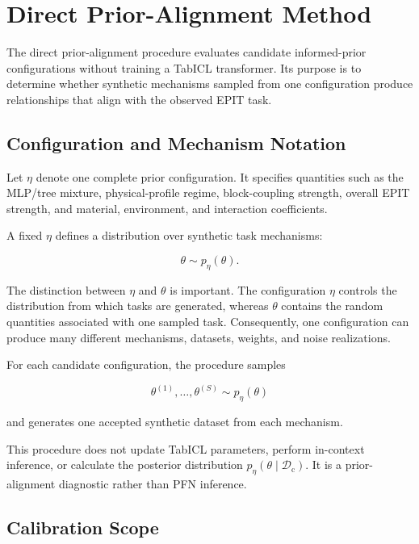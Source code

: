 \documentclass{article}
\begin{document}
\section{Direct Prior-Alignment Method}
\label{sec:direct-prior-method}

The direct prior-alignment procedure evaluates candidate informed-prior configurations without training a TabICL transformer. Its purpose is to determine whether synthetic mechanisms sampled from one configuration produce relationships that align with the observed EPIT task.

\subsection{Configuration and Mechanism Notation}

Let \(\eta\) denote one complete prior configuration. It specifies quantities such as the MLP/tree mixture, physical-profile regime, block-coupling strength, overall EPIT strength, and material, environment, and interaction coefficients.

A fixed \(\eta\) defines a distribution over synthetic task mechanisms:

\begin{equation}
\theta\sim p_{\eta}(\theta).
\label{eq:eta-mechanism-distribution}
\end{equation}

The distinction between \(\eta\) and \(\theta\) is important. The configuration \(\eta\) controls the distribution from which tasks are generated, whereas \(\theta\) contains the random quantities associated with one sampled task. Consequently, one configuration can produce many different mechanisms, datasets, weights, and noise realizations.

For each candidate configuration, the procedure samples

\begin{equation}
\theta^{(1)},\ldots,\theta^{(S)}
\sim
p_{\eta}(\theta)
\label{eq:sampled-theta-mechanisms}
\end{equation}

and generates one accepted synthetic dataset from each mechanism.

This procedure does not update TabICL parameters, perform in-context inference, or calculate the posterior distribution \(p_{\eta}(\theta\mid\mathcal{D}_{\mathrm{c}})\). It is a prior-alignment diagnostic rather than PFN inference.

\subsection{Calibration Scope}
\end{document}
